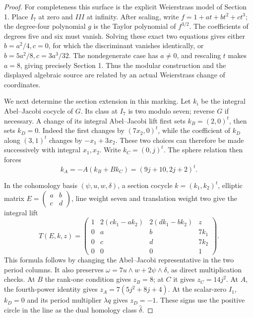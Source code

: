 \begin{proof}
For completeness this surface is the explicit Weierstrass model of Section 1. Place \(I_7\) at zero and \(III\) at infinity. After scaling, write \(f=1+at+bt^2+ct^3\); the degree-four polynomial \(g\) is the Taylor polynomial of \(f^{3/2}\). The coefficients of degrees five and six must vanish. Solving these exact two equations gives either \(b=a^2/4,c=0\), for which the discriminant vanishes identically, or \(b=5a^2/8,c=3a^3/32\). The nondegenerate case has \(a\ne0\), and rescaling \(t\) makes \(a=8\), giving precisely Section 1. Thus the modular construction and the displayed algebraic source are related by an actual Weierstrass change of coordinates.

We next determine the section extension in this marking. Let \(k_i\) be the integral Abel--Jacobi cocycle of \(G\). Its class at \(I_7\) is two modulo seven; reverse \(G\) if necessary. A change of its integral Abel--Jacobi lift first sets \(k_B=(2,0)^t\), then sets \(k_D=0\). Indeed the first changes by \((7x_2,0)^t\), while the coefficient of \(k_D\) along \((3,1)^t\) changes by \(-x_1+3x_2\). These two choices can therefore be made successively with integral \(x_1,x_2\). Write \(k_C=(0,j)^t\). The sphere relation then forces \[
 k_A=-A(k_B+Bk_C)=(9j+10,2j+2)^t.
\]

In the cohomology basis \((\psi,u,w,\delta)\), a section cocycle \(k=(k_1,k_2)^t\), elliptic matrix \(E=\left(\begin{smallmatrix}a&b\\c&d\end{smallmatrix}\right)\), line weight seven and translation weight two give the integral lift \[
 T(E,k,z)=
 \begin{pmatrix}
 1&2(ck_1-ak_2)&2(dk_1-bk_2)&z\\
 0&a&b&7k_1\\0&c&d&7k_2\\0&0&0&1
 \end{pmatrix}.
\] This formula follows by changing the Abel--Jacobi representative in the two period columns. It also preserves \(\omega=7u\wedge w+2\psi\wedge\delta\), as direct multiplication checks. At \(B\) the rank-one condition gives \(z_B=8\); at \(C\) it gives \(z_C=14j^2\). At \(A\), the fourth-power identity gives \(z_A=7(5j^2+8j+4)\). At the scalar-zero \(I_1\), \(k_D=0\) and its period multiplier \(\lambda q\) gives \(z_D=-1\). These signs use the positive circle in the line as the dual homology class \(\widehat\delta\).


\end{proof}
